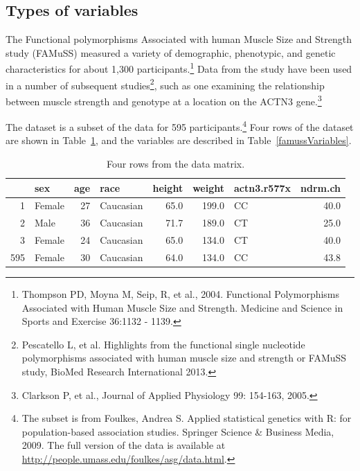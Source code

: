 

\subsection{Types of variables}
\label{variableTypes}


The Functional polymorphisms Associated with human Muscle Size and Strength study (FAMuSS) measured a variety of demographic, phenotypic, and genetic characteristics for about 1,300 participants.\footnote{Thompson PD, Moyna M, Seip, R, et al., 2004.  Functional Polymorphisms Associated with Human Muscle Size and Strength.  Medicine and Science in Sports and Exercise 36:1132 - 1139.} Data from the study have been used in a number of subsequent studies\footnote{Pescatello L, et al. Highlights from the functional single nucleotide polymorphisms associated with human muscle size and strength or FAMuSS study, BioMed Research International 2013.}, such as one examining the relationship between muscle strength and genotype at a location on the ACTN3 gene.\footnote{Clarkson P, et al., Journal of Applied Physiology 99: 154-163, 2005.} 

The  dataset is a subset of the data for 595 participants.\footnote{The subset is from Foulkes, Andrea S. Applied statistical genetics with R: for population-based association studies. Springer Science \& Business Media, 2009. The full version of the data is available at \url{http://people.umass.edu/foulkes/asg/data.html}.} Four rows of the  dataset are shown in Table~\ref{famussDF}, and the variables are described in Table~\ref{famussVariables}.

\begin{table}[ht]
	\centering
	\begin{tabular}{rlrlrrlr}
		\hline
		& sex & age & race & height & weight & actn3.r577x & ndrm.ch \\ 
		\hline
		1 & Female & 27 & Caucasian & 65.0 & 199.0 & CC & 40.0 \\ 
		2 & Male & 36 & Caucasian & 71.7 & 189.0 & CT & 25.0 \\ 
		3 & Female & 24 & Caucasian & 65.0 & 134.0 & CT & 40.0 \\ 
		595 & Female & 30 & Caucasian & 64.0 & 134.0 & CC & 43.8 \\ 
		\hline
	\end{tabular}
	
	
	\caption{Four rows from the  data matrix.}
	\label{famussDF}
\end{table}

